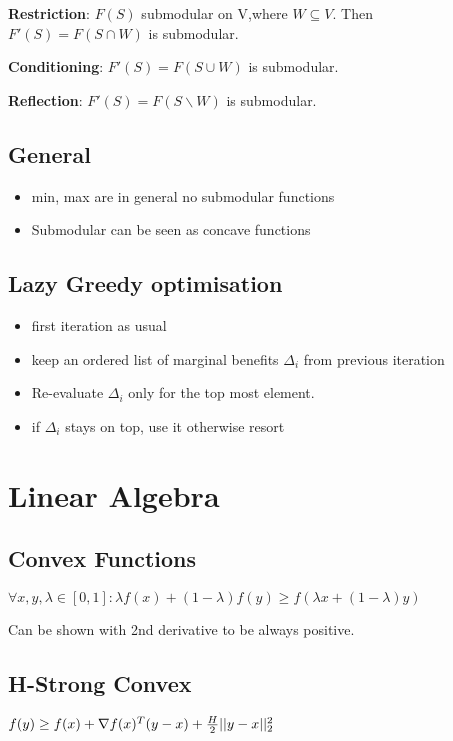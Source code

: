 \documentclass[a4paper,11pt,twocolumn]{article}
\begin{document}
\textbf{Restriction}: $F(S)$ submodular on V,where $W \subseteq V$. Then $F'(S) = F(S \cap W)$ is submodular.

\textbf{Conditioning}: $F'(S) = F(S \cup W)$ is submodular.

\textbf{Reflection}: $F'(S) = F(S \backslash W)$ is submodular.

\subsection{General}
\begin{itemize}[noitemsep,topsep=0pt,parsep=0pt,partopsep=0pt]
\item min, max are in general no submodular functions
\item Submodular can be seen as concave functions
\end{itemize} 

\subsection{Lazy Greedy optimisation}
\begin{itemize}[noitemsep,topsep=0pt,parsep=0pt,partopsep=0pt]
\item first iteration as usual
\item keep an ordered list of marginal benefits $\Delta_i$ from previous iteration
\item 	Re-evaluate $\Delta_i$ only for the top most element.
\item if $\Delta_i$ stays on top, use it otherwise resort
\end{itemize}



\section{Linear Algebra}

\subsection{Convex Functions}
$\forall x,y, \lambda \in [0,1] : \lambda f(x) + (1-\lambda)f(y) \geq f(\lambda x +  (1-\lambda) y)$

Can be shown with 2nd derivative to be always positive.

\subsection{H-Strong Convex}
$f(y) \geq f(x) + \nabla f(x)^T(y-x) + {H \over 2 } || y - x ||_2^2$
\end{document}
